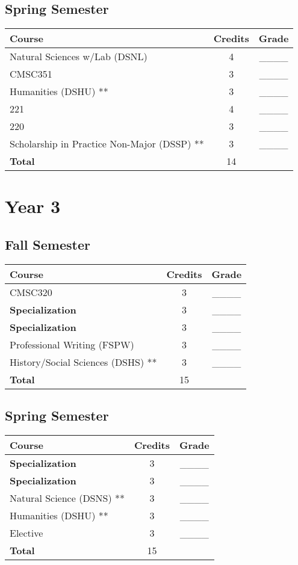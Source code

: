 \subsection*{Spring Semester}
\begin{tabular}{|l|c|c|}
    \hline
    Course & Credits & Grade \\
    \hline
    Natural Sciences w/Lab (DSNL) & 4 & \_\_\_\_ \\    
    CMSC351 & 3 & \_\_\_\_ \\
    Humanities (DSHU) ** & 3 & \_\_\_\_ \\
    \prefix{}221 & 4 & \_\_\_\_ \\
    \prefix{}220 & 3 & \_\_\_\_ \\
    Scholarship in Practice Non-Major (DSSP) ** & 3 & \_\_\_\_ \\
    \hline
    \textbf{Total} & 14 & \\
    \hline
\end{tabular}

\section*{Year 3}
\subsection*{Fall Semester}
\begin{tabular}{|l|c|c|}
    \hline
    Course & Credits & Grade \\
    \hline
    CMSC320 & 3 & \_\_\_\_ \\
     \textbf{Specialization} & 3 & \_\_\_\_ \\
     \textbf{Specialization} & 3 & \_\_\_\_ \\
    Professional Writing (FSPW) & 3 & \_\_\_\_ \\
History/Social Sciences (DSHS) ** & 3 & \_\_\_\_ \\
    \hline
    \textbf{Total} & 15 & \\
    \hline
\end{tabular}

\subsection*{Spring Semester}
\begin{tabular}{|l|c|c|}
    \hline
    Course & Credits & Grade \\
    \hline
    \textbf{Specialization} & 3 & \_\_\_\_ \\
   \textbf{Specialization} & 3 & \_\_\_\_ \\
   Natural Science (DSNS) ** & 3 & \_\_\_\_ \\
Humanities (DSHU) ** & 3 & \_\_\_\_ \\
Elective & 3 & \_\_\_\_ \\
    \hline
    \textbf{Total} & 15 & \\
    \hline
\end{tabular}

